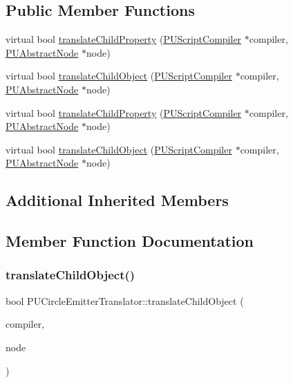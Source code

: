 \subsection*{Public Member Functions}
\begin{DoxyCompactItemize}
\item 
virtual bool \hyperlink{classPUCircleEmitterTranslator_a90ff348c065a8ebf8d907de94028db14}{translate\+Child\+Property} (\hyperlink{classPUScriptCompiler}{P\+U\+Script\+Compiler} $\ast$compiler, \hyperlink{classPUAbstractNode}{P\+U\+Abstract\+Node} $\ast$node)
\item 
virtual bool \hyperlink{classPUCircleEmitterTranslator_afd7eac4645a8bf554abd7b2ac07c1e63}{translate\+Child\+Object} (\hyperlink{classPUScriptCompiler}{P\+U\+Script\+Compiler} $\ast$compiler, \hyperlink{classPUAbstractNode}{P\+U\+Abstract\+Node} $\ast$node)
\item 
virtual bool \hyperlink{classPUCircleEmitterTranslator_a834ed9590bdcbdd4ba6752c4a1dede24}{translate\+Child\+Property} (\hyperlink{classPUScriptCompiler}{P\+U\+Script\+Compiler} $\ast$compiler, \hyperlink{classPUAbstractNode}{P\+U\+Abstract\+Node} $\ast$node)
\item 
virtual bool \hyperlink{classPUCircleEmitterTranslator_a2d7857dbf573e2f094fb151d4581ebd2}{translate\+Child\+Object} (\hyperlink{classPUScriptCompiler}{P\+U\+Script\+Compiler} $\ast$compiler, \hyperlink{classPUAbstractNode}{P\+U\+Abstract\+Node} $\ast$node)
\end{DoxyCompactItemize}
\subsection*{Additional Inherited Members}


\subsection{Member Function Documentation}
\mbox{\label{classPUCircleEmitterTranslator_afd7eac4645a8bf554abd7b2ac07c1e63}} 
\subsubsection{\texorpdfstring{translate\+Child\+Object()}{translateChildObject()}\hspace{0.1cm}{\footnotesize\ttfamily [1/2]}}
{\footnotesize\ttfamily bool P\+U\+Circle\+Emitter\+Translator\+::translate\+Child\+Object (\begin{DoxyParamCaption}\item[{\hyperlink{classPUScriptCompiler}{P\+U\+Script\+Compiler} $\ast$}]{compiler,  }\item[{\hyperlink{classPUAbstractNode}{P\+U\+Abstract\+Node} $\ast$}]{node }\end{DoxyParamCaption})\hspace{0.3cm}{\ttfamily [virtual]}}

